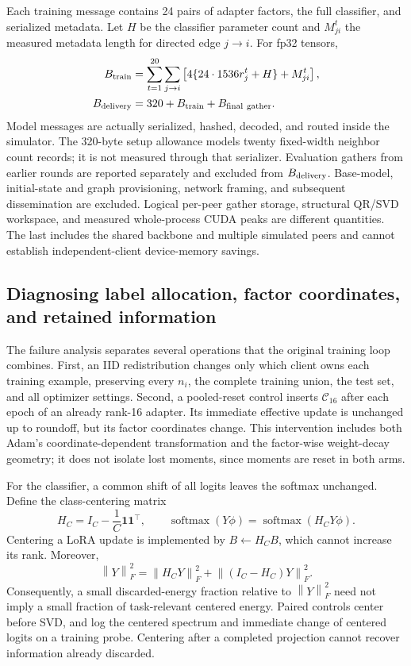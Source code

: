 \documentclass[11pt]{article}
\newcommand{\norm}[1]{\left\lVert#1\right\rVert}
\begin{document}
Each training message contains 24 pairs of adapter factors, the full classifier, and serialized metadata. Let $H$ be the classifier parameter count and $M_{ji}^t$ the measured metadata length for directed edge $j\to i$. For fp32 tensors,
\begin{align}
 B_{\rm train}&=\sum_{t=1}^{20}\sum_{j\to i}
 \left[4\{24\cdot1536r_j^t+H\}+M_{ji}^t\right],\\
 B_{\rm delivery}&=320+B_{\rm train}+B_{\rm final\ gather}.
 \label{eq:quantity-bytes}
\end{align}
Model messages are actually serialized, hashed, decoded, and routed inside the simulator. The 320-byte setup allowance models twenty fixed-width neighbor count records; it is not measured through that serializer. Evaluation gathers from earlier rounds are reported separately and excluded from $B_{\rm delivery}$. Base-model, initial-state and graph provisioning, network framing, and subsequent dissemination are excluded. Logical per-peer gather storage, structural QR/SVD workspace, and measured whole-process CUDA peaks are different quantities. The last includes the shared backbone and multiple simulated peers and cannot establish independent-client device-memory savings.

\subsection{Diagnosing label allocation, factor coordinates, and retained information}
The failure analysis separates several operations that the original training loop combines. First, an IID redistribution changes only which client owns each training example, preserving every $n_i$, the complete training union, the test set, and all optimizer settings. Second, a pooled-reset control inserts $\mathcal C_{16}$ after each epoch of an already rank-16 adapter. Its immediate effective update is unchanged up to roundoff, but its factor coordinates change. This intervention includes both Adam's coordinate-dependent transformation and the factor-wise weight-decay geometry; it does not isolate lost moments, since moments are reset in both arms.

For the classifier, a common shift of all logits leaves the softmax unchanged. Define the class-centering matrix
\begin{equation}
 H_C=I_C-\frac1C\mathbf1\mathbf1^\top,\qquad
 \operatorname{softmax}(Y\phi)=\operatorname{softmax}(H_CY\phi).
 \label{eq:class-centering}
\end{equation}
Centering a LoRA update is implemented by $B\leftarrow H_CB$, which cannot increase its rank. Moreover,
\begin{equation}
 \norm{Y}_F^2=\norm{H_CY}_F^2+\norm{(I_C-H_C)Y}_F^2.
\end{equation}
Consequently, a small discarded-energy fraction relative to $\norm{Y}_F^2$ need not imply a small fraction of task-relevant centered energy. Paired controls center before SVD, and log the centered spectrum and immediate change of centered logits on a training probe. Centering after a completed projection cannot recover information already discarded.
\end{document}
